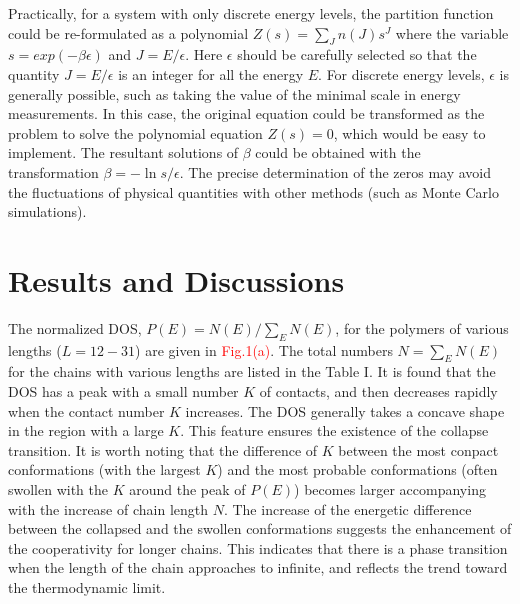 \documentclass[preprint,preprintnumbers,amsmath,amssymb,showpacs,aps,pre]{revtex4-1}
\begin{document}
Practically, for a system with only discrete energy levels, the partition
function could be
re-formulated as a polynomial $Z(s)=\sum_J n(J) s^J$ where the variable
$s=exp(-\beta\epsilon)$ and $J=E/\epsilon$. Here $\epsilon$ should be carefully
selected so that the quantity $J=E/\epsilon$ is an integer for all the energy
$E$. For discrete energy levels, $\epsilon$ is generally possible, such as
taking the value of the minimal scale in energy measurements. In this case, the
original equation could be transformed as the problem to solve the polynomial
equation $Z(s)=0$, which would be easy to implement. The resultant solutions
of $\beta$ could be obtained with the transformation $\beta=-\ln s/\epsilon$.
The precise determination of the zeros may avoid the fluctuations of physical
quantities with other methods (such as Monte Carlo simulations).

\section{Results and Discussions}

The normalized DOS, $P(E)=N(E)/\sum_E N(E)$, for the polymers of various
lengths ($L=12-31$) are given in \textcolor{red}{Fig.1(a)}. The total
numbers $N=\sum_E N(E)$ for the chains with various lengths are listed
in the Table I. It is found that the DOS has a peak with a small number $K$ of
contacts, and then decreases rapidly when the contact number $K$ increases.
The DOS generally takes a concave shape in the region with a large $K$. This
feature ensures the existence of the collapse transition. It is worth noting that
the difference of $K$ between the most conpact conformations (with the largest
$K$) and the most probable conformations (often swollen with the $K$ around
the peak of $P(E)$) becomes larger accompanying with the increase of chain
length $N$. The increase of the energetic difference between the collapsed
and the swollen conformations suggests the enhancement of the cooperativity
for longer chains. This indicates that there is a phase transition when the length
of the chain approaches to infinite, and reflects the trend toward the thermodynamic
limit.
\end{document}
